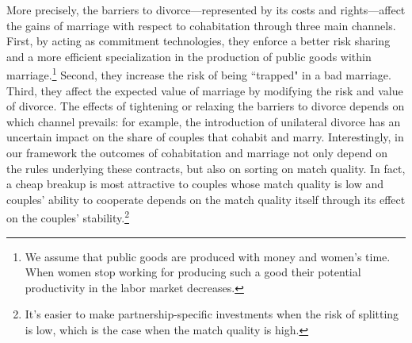 \documentclass[12pt]{article}
\numberwithin{table}{section}
\begin{document}
More precisely, the barriers to divorce---represented by its costs and rights---affect the gains of marriage with respect to cohabitation through three main channels. First, by acting as commitment technologies, they enforce a better risk sharing and a more efficient specialization in the production of public goods within marriage.\footnote{We assume that public goods are produced with money and women's time. When women stop working for producing such a good their potential productivity in the labor market decreases.} Second, they increase the risk of being ``trapped" in a bad marriage. Third, they affect the expected value of marriage by modifying the risk and value of divorce. The effects of tightening or relaxing the barriers to divorce depends on which channel prevails: for example, the introduction of unilateral divorce has an uncertain impact on the share of couples that cohabit and marry. 
Interestingly, in our framework  the outcomes of cohabitation and marriage not only depend on the rules underlying these contracts, but also on sorting on match quality. In fact, a cheap breakup is most attractive to couples whose match quality is low and couples' ability to cooperate depends on the match quality itself through its effect on the couples' stability.\footnote{It's easier to make partnership-specific investments when the risk of splitting is low, which is the case when the match quality is high.}

%



\end{document}
